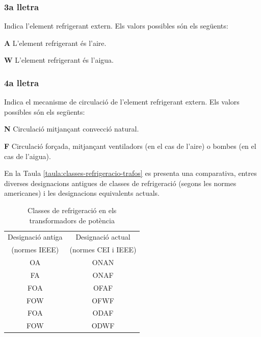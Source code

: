\subsubsection*{3a lletra}
 Indica l'element refrigerant extern. Els valors
possibles s\'{o}n els seg\"{u}ents:
\begin{list}{}
   {\setlength{\labelwidth}{10mm} \setlength{\leftmargin}{10mm} \setlength{\labelsep}{2mm}}
   \item[\textbf{A}] L'element refrigerant \'{e}s l'aire.
   \item[\textbf{W}] L'element refrigerant \'{e}s l'aigua.
\end{list}
 

\subsubsection*{4a lletra}
 Indica el mecanisme de circulaci\'{o} de l'element
refrigerant extern. Els valors possibles s\'{o}n els seg\"{u}ents:
\begin{list}{}
   {\setlength{\labelwidth}{10mm} \setlength{\leftmargin}{10mm} \setlength{\labelsep}{2mm}}
   \item[\textbf{N}] Circulaci\'{o} mitjan\c{c}ant convecci\'{o} natural.
   \item[\textbf{F}] Circulaci\'{o} for\c{c}ada, mitjan\c{c}ant ventiladors (en el cas de
   l'aire) o bombes (en el cas de l'aigua).
\end{list}
 

En la Taula \vref{taula:classes-refrigeracio-trafos} es presenta una
comparativa, entres diverses designacions antigues de classes de
refrigeraci\'{o} (segons les normes americanes) i les designacions
equivalents actuals.

\begin{table}[h]
   \caption{\label{taula:classes-refrigeracio-trafos}
   Classes de refrigeraci\'{o} en els transformadors de pot\`{e}ncia}
   \begin{center}\begin{tabular}{cc}
   \toprule[1pt]
   Designaci\'{o} antiga & Designaci\'{o} actual \\
   (normes \textsf{\textsf{IEEE}})     & (normes \textsf{\textsf{CEI}} i
   \textsf{\textsf{IEEE}}) \\
   \midrule
   OA & ONAN   \\
   FA & ONAF   \\
   FOA & OFAF  \\
   FOW & OFWF  \\
   FOA & ODAF  \\
   FOW & ODWF \\
   \bottomrule[1pt]
   \end{tabular} \end{center}
\end{table}


